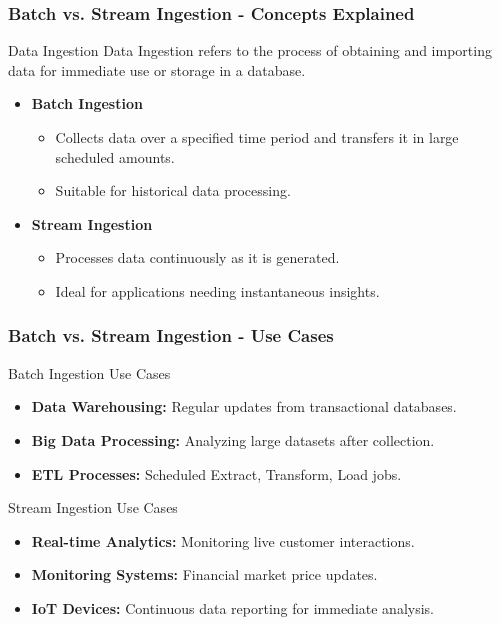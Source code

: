 \documentclass{beamer}
\begin{document}
\begin{frame}[fragile]
    \frametitle{Batch vs. Stream Ingestion - Concepts Explained}
    
    \begin{block}{Data Ingestion}
        Data Ingestion refers to the process of obtaining and importing data for immediate use or storage in a database. 
    \end{block}

    \begin{itemize}
        \item \textbf{Batch Ingestion}
        \begin{itemize}
            \item Collects data over a specified time period and transfers it in large scheduled amounts.
            \item Suitable for historical data processing.
        \end{itemize}
        
        \item \textbf{Stream Ingestion}
        \begin{itemize}
            \item Processes data continuously as it is generated.
            \item Ideal for applications needing instantaneous insights.
        \end{itemize}
    \end{itemize}
\end{frame}

\begin{frame}[fragile]
    \frametitle{Batch vs. Stream Ingestion - Use Cases}
    
    \begin{block}{Batch Ingestion Use Cases}
        \begin{itemize}
            \item \textbf{Data Warehousing:} Regular updates from transactional databases.
            \item \textbf{Big Data Processing:} Analyzing large datasets after collection.
            \item \textbf{ETL Processes:} Scheduled Extract, Transform, Load jobs.
        \end{itemize}
    \end{block}
    
    \begin{block}{Stream Ingestion Use Cases}
        \begin{itemize}
            \item \textbf{Real-time Analytics:} Monitoring live customer interactions.
            \item \textbf{Monitoring Systems:} Financial market price updates.
            \item \textbf{IoT Devices:} Continuous data reporting for immediate analysis.
        \end{itemize}
    \end{block}
\end{frame}
\end{document}

